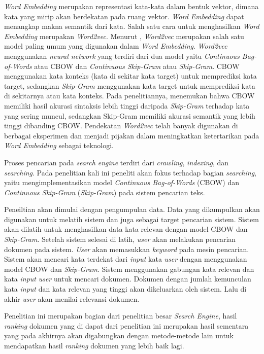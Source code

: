 \documentclass[12pt]{report}
\begin{document}
\textit{Word Embedding} merupakan representasi kata-kata dalam bentuk vektor, dimana kata yang mirip akan berdekatan pada ruang vektor. \textit{Word Embedding} dapat menangkap makna semantik dari kata. Salah satu cara untuk menghasilkan \textit{Word Embedding} merupakan \textit{Word2vec}. Menurut , \textit{Word2vec} merupakan salah satu model paling umum yang digunakan dalam \textit{Word Embedding}. \textit{Word2vec} menggunakan \textit{neural network} yang terdiri dari dua model yaitu \textit{Continuous Bag-of-Words} atau CBOW dan \textit{Continuous Skip-Gram} atau \textit{Skip-Gram}. CBOW menggunakan kata konteks (kata di sekitar kata target) untuk memprediksi kata target, sedangkan \textit{Skip-Gram} menggunakan kata target untuk memprediksi kata di sekitarnya atau kata konteks. Pada penelitiannya,  menemukan bahwa CBOW memiliki hasil akurasi sintaksis lebih tinggi daripada \textit{Skip-Gram} terhadap kata yang sering muncul, sedangkan Skip-Gram memiliki akurasi semantik yang lebih tinggi dibanding CBOW. Pendekatan \textit{Word2vec} telah banyak digunakan di berbagai eksperimen dan menjadi pijakan dalam meningkatkan ketertarikan pada \textit{Word Embedding} sebagai teknologi.

Proses pencarian pada \textit{search engine} terdiri dari \textit{crawling}, \textit{indexing}, dan \textit{searching}. Pada penelitian kali ini peneliti akan fokus terhadap bagian \textit{searching}, yaitu mengimplementasikan model \textit{Continuous Bag-of-Words} (CBOW) dan \textit{Continuous Skip-Gram} (\textit{Skip-Gram}) pada sistem pencarian teks. 

Peneiltian akan dimulai dengan pengumpulan data. Data yang dikumpulkan akan digunakan untuk melatih sistem dan juga sebagai target pencarian sistem. Sistem akan dilatih untuk menghasilkan data kata relevan dengan model CBOW dan \textit{Skip-Gram}. Setelah sistem selesai di latih, \textit{user} akan melakukan pencarian dokumen pada sistem. \textit{User} akan memasukkan \textit{keyword} pada mesin pencarian. Sistem akan mencari kata terdekat dari \textit{input} kata \textit{user} dengan menggunakan model CBOW dan \textit{Skip-Gram}. Sistem menggunakan gabungan kata relevan dan kata \textit{input} \textit{user} untuk mencari dokumen. Dokumen dengan jumlah kemunculan kata \textit{input} dan kata relevan yang tinggi akan dikeluarkan oleh sistem. Lalu di akhir \textit{user} akan menilai relevansi dokumen.

Penelitian ini merupakan bagian dari penelitian besar \textit{Search Engine}, hasil \textit{ranking} dokumen yang di dapat dari penelitian ini merupakan hasil sementara yang pada akhirnya akan digabungkan dengan metode-metode lain untuk mendapatkan hasil \textit{ranking} dokumen yang lebih baik lagi.
\end{document}
